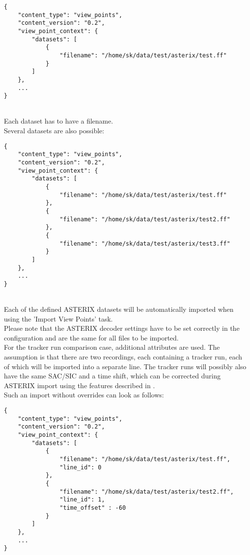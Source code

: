 \begin{lstlisting}[basicstyle=\small\ttfamily]
{
    "content_type": "view_points",
    "content_version": "0.2",
    "view_point_context": {
        "datasets": [
            {
                "filename": "/home/sk/data/test/asterix/test.ff"
            }
        ]
    },
    ...
}
\end{lstlisting}
\ \\

Each dataset has to have a filename. \\

Several datasets are also possible:
\begin{lstlisting}[basicstyle=\small\ttfamily]
{
    "content_type": "view_points",
    "content_version": "0.2",
    "view_point_context": {
        "datasets": [
            {
                "filename": "/home/sk/data/test/asterix/test.ff"
            },
            {
                "filename": "/home/sk/data/test/asterix/test2.ff"
            },
            {
                "filename": "/home/sk/data/test/asterix/test3.ff"
            }
        ]
    },
    ...
}
\end{lstlisting}
\ \\

Each of the defined ASTERIX datasets will be automatically imported when using the 'Import View Points' task. \\

Please note that the ASTERIX decoder settings have to be set correctly in the configuration and are the same for all files to be imported. \\

For the tracker run comparison case, additional attributes are used. The assumption is that there are two recordings, each containing a tracker run, each of which will be imported into a separate line. The tracker runs will possibly also have the same SAC/SIC and a time shift, which can be corrected during ASTERIX import using the features described in . \\

Such an import without overrides can look as follows:

\begin{lstlisting}[basicstyle=\small\ttfamily]
{
    "content_type": "view_points",
    "content_version": "0.2",
    "view_point_context": {
        "datasets": [
            {
                "filename": "/home/sk/data/test/asterix/test.ff",
                "line_id": 0
            },
            {
                "filename": "/home/sk/data/test/asterix/test2.ff",
                "line_id": 1,
                "time_offset" : -60
            }
        ]
    },
    ...
}
\end{lstlisting}
\ \\

